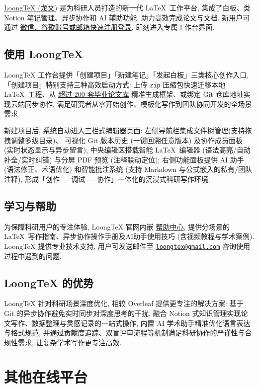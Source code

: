 \href{https://www.loongtex.com}{LoongTeX (龙文)}
是为科研人员打造的新一代 \LaTeX\ 工作平台,
集成了白板、类 Notion 笔记管理、异步协作和 AI 辅助功能, 助力高效完成论文与文档.
新用户可通过%
\href{https://app.loongtex.com/user/login}{微信、谷歌账号或邮箱快速注册登录},
即刻进入专属工作台界面.

\subsection{使用 LoongTeX}

LoongTeX 工作台提供「创建项目」「新建笔记」「发起白板」三类核心创作入口,
「创建项目」特别支持三种高效启动方式: 上传 \texttt{zip} 压缩包快速迁移本地 \LaTeX\ 工程、从%
\href{https://www.loongtex.com/templates}{超过 200 套毕业论文库}%
精准生成框架、或绑定 Git 仓库地址实现云端同步协作,
满足研究者从零开始创作、模板化写作到团队协同开发的全场景需求.

新建项目后, 系统自动进入三栏式编辑器页面: 左侧导航栏集成文件树管理(支持拖拽调整多级目录)、
可视化 Git 版本历史 (一键回溯任意版本) 及协作成员面板 (实时状态显示与异步留言);
中央编辑区搭载智能 \LaTeX\ 编辑器 (语法高亮/自动补全/实时纠错)
与分屏 PDF 预览 (注释联动定位);
右侧功能面板提供 AI 助手 (语法修正、术语优化)
和智能批注系统 (支持 Markdown 与公式嵌入的私有/团队注释),
形成「创作 --- 调试 --- 协作」一体化的沉浸式科研写作环境.

\subsection{学习与帮助}

为保障科研用户的专注体验, LoongTeX 官网内嵌%
\href{https://www.loongtex.com/docs/app/help}{帮助中心},
提供分场景的 \LaTeX\ 写作指南、异步协作操作手册及AI助手使用技巧 (含视频教程与学术案例).
LoongTeX 提供专业技术支持, 用户可发送邮件至
\href{mailto:loongtex@gmail.com}{\texttt{loongtex@gmail.com}}
咨询使用过程中遇到的问题.

\subsection{LoongTeX 的优势}

LoongTeX 针对科研场景深度优化, 相较 Overleaf 提供更专注的解决方案:
基于 Git 的异步协作避免实时同步对深度思考的干扰,
融合 Notion 式知识管理实现论文写作、数据整理与灵感记录的一站式操作,
内置 AI 学术助手精准优化语言表达与格式规范,
并通过贡献度追踪、双盲评审流程等机制满足科研协作的严谨性与合规性需求,
让复杂学术写作更专注高效.

\section{其他在线平台}

